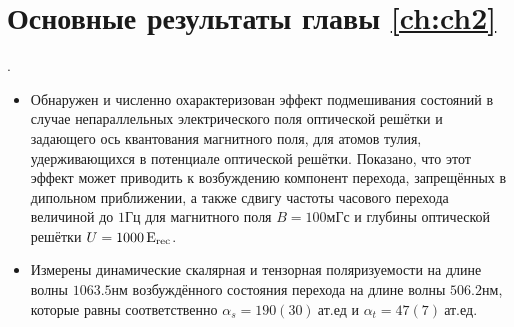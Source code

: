 \section{Основные результаты главы \ref{ch:ch2}}.

\begin{itemize}
	\item Обнаружен и численно охарактеризован эффект подмешивания состояний в случае непараллельных электрического поля оптической решётки и задающего ось квантования магнитного поля, для атомов тулия, удерживающихся в потенциале оптической решётки.
	Показано, что этот эффект может приводить к возбуждению компонент перехода, запрещённых в дипольном приближении, а также сдвигу частоты часового перехода величиной до $1\unit{Гц}$ для магнитного поля $B = 100\unit{мГс}$ и глубины оптической решётки $U = 1000 \,\textrm{E}_{\text{rec}}$.
	\item Измерены динамические скалярная и тензорная поляризуемости  на длине волны $1063.5\unit{нм}$ возбуждённого состояния перехода на длине волны $506.2\unit{нм}$, которые равны соответственно $\alpha_s = 190(30)~\text{ат.ед}$ и $\alpha_t = 47(7)~\text{ат.ед}$.
\end{itemize}
